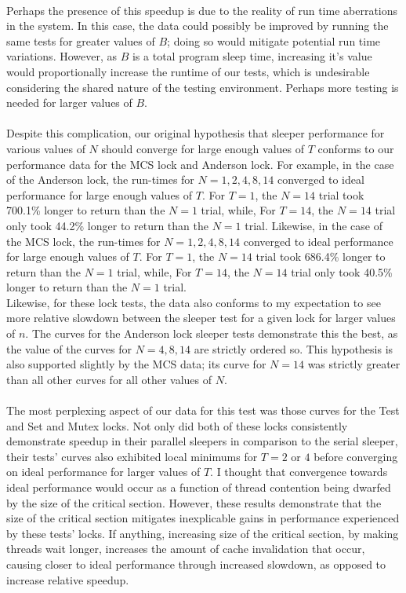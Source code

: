 \documentclass[]{article}
\begin{document}
\\
Perhaps the presence of this speedup is due to the reality of run time aberrations in the system. In this case, the data could possibly be improved by running the same tests for greater values of $B$; doing so would mitigate potential run time variations. However, as $B$ is a total program sleep time, increasing it's value would proportionally increase the runtime of our tests, which is undesirable considering the shared nature of the testing environment. Perhaps more testing is needed for larger values of $B$.
\\\\
Despite this complication, our original hypothesis that sleeper performance for various values of $N$ should converge for large enough values of $T$ conforms to our performance data for the MCS lock and Anderson lock. For example, in the case of the Anderson lock, the run-times for $N = 1,2,4,8,14$ converged to ideal performance for large enough values of $T$. For $T = 1$, the $N = 14$ trial took 700.1\% longer to return than the $N = 1$ trial, while, For $T = 14$, the $N = 14$ trial only took 44.2\% longer to return than the $N = 1$ trial. Likewise,  in the case of the MCS  lock, the run-times for $N = 1,2,4,8,14$ converged to ideal performance for large enough values of $T$. For $T = 1$, the $N = 14$ trial took 686.4\% longer to return than the $N = 1$ trial, while, For $T = 14$, the $N = 14$ trial only took 40.5\% longer to return than the $N = 1$ trial. 
\\
Likewise, for these lock tests, the data also conforms to my expectation to see more relative slowdown between the sleeper test for a given lock for larger values of $n$. The curves for the Anderson lock sleeper tests demonstrate this the best, as the value of the curves for $N = 4, 8, 14$ are strictly ordered so. This hypothesis is also supported slightly by the MCS data; its curve for $N = 14$ was strictly greater than all other curves for all other values of $N$.
\\\\
The most perplexing aspect of our data for this test was those curves for the Test and Set and Mutex locks. Not only did both of these locks consistently demonstrate speedup in their parallel sleepers in comparison to the serial sleeper, their tests' curves also exhibited local minimums for $T = 2$ or $4$ before converging on ideal performance for larger values of $T$. I thought that convergence towards ideal performance would occur as a function of thread contention being dwarfed by the size of the critical section. However, these results demonstrate that the size of the critical section mitigates inexplicable gains in performance experienced by these tests' locks. If anything, increasing size of the critical section, by making threads wait longer, increases the amount of cache invalidation that occur, causing closer to ideal performance through increased slowdown, as opposed to increase relative speedup.
\end{document}
